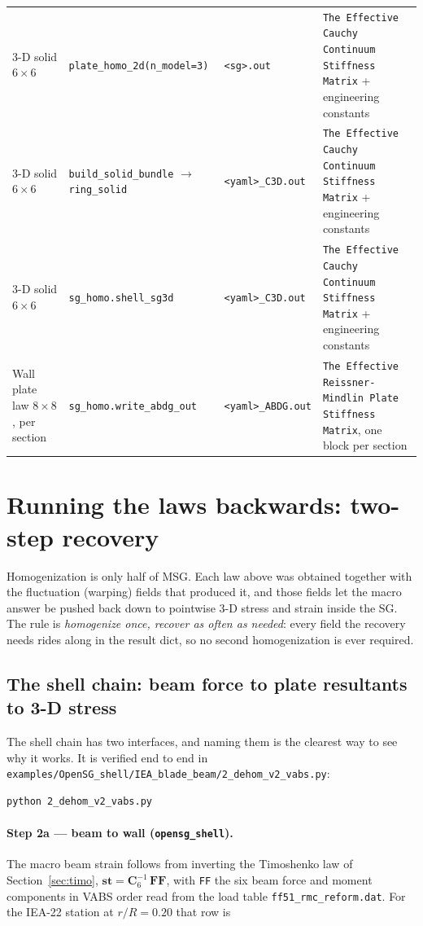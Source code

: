 \begin{table}[htbp]
\begin{tabular}{p{2.5cm}p{4.6cm}p{3.9cm}p{3.5cm}}
3-D solid $6\times6$ & \texttt{plate\_homo\_2d(n\_model=3)} & \texttt{<sg>.out} & \texttt{The Effective Cauchy Continuum Stiffness Matrix} + engineering constants \\
3-D solid $6\times6$ & \texttt{build\_solid\_bundle} $\rightarrow$ \texttt{ring\_solid} & \texttt{<yaml>\_C3D.out} & \texttt{The Effective Cauchy Continuum Stiffness Matrix} + engineering constants \\
3-D solid $6\times6$ & \texttt{sg\_homo.shell\_sg3d} & \texttt{<yaml>\_C3D.out} & \texttt{The Effective Cauchy Continuum Stiffness Matrix} + engineering constants \\
Wall plate law $8\times8$, per section & \texttt{sg\_homo.write\_abdg\_out} & \texttt{<yaml>\_ABDG.out} & \texttt{The Effective Reissner-Mindlin Plate Stiffness Matrix}, one block per section \\
\bottomrule
\end{tabular}
\end{table}

\section{Running the laws backwards: two-step recovery}
\label{sec:recovery}

Homogenization is only half of MSG. Each law above was obtained together with
the fluctuation (warping) fields that produced it, and those fields let the
macro answer be pushed back down to pointwise 3-D stress and strain inside the
SG. The rule is \emph{homogenize once, recover as often as needed}: every field
the recovery needs rides along in the result dict, so no second homogenization
is ever required.

\subsection{The shell chain: beam force to plate resultants to 3-D stress}

The shell chain has two interfaces, and naming them is the clearest way to see
why it works. It is verified end to end in
\texttt{examples/OpenSG\_shell/IEA\_blade\_beam/2\_dehom\_v2\_vabs.py}:

\begin{lstlisting}[style=shellst]
python 2_dehom_v2_vabs.py
\end{lstlisting}

\paragraph{Step 2a --- beam to wall (\texttt{opensg\_shell}).}
The macro beam strain follows from inverting the Timoshenko law of
Section~\ref{sec:timo}, $\mathbf{st} = \mathbf C_6^{-1}\,\mathbf{FF}$, with
\texttt{FF} the six beam force and moment components in VABS order read from
the load table \texttt{ff51\_rmc\_reform.dat}. For the IEA-22 station at
$r/R = 0.20$ that row is

